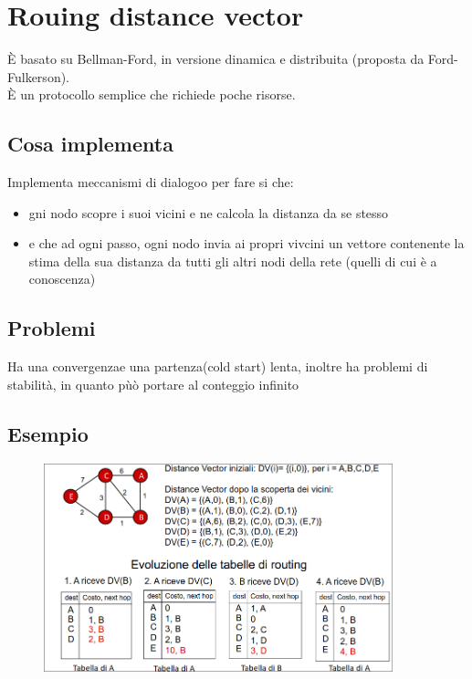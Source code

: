 \documentclass{report}
\begin{document}
        \section{Rouing distance vector}
            È basato su Bellman-Ford, in versione dinamica e distribuita (proposta da Ford-Fulkerson).
            \\
            È un protocollo semplice che richiede poche risorse.
            \subsection{Cosa implementa}
                Implementa meccanismi di dialogoo per fare si che:
                \begin{itemize}
                    \item gni nodo scopre i suoi vicini e ne calcola la distanza da se stesso
                    \item e che ad ogni passo, ogni nodo invia ai propri vivcini un vettore contenente la stima della sua distanza da tutti gli altri nodi della rete (quelli di cui è a conoscenza)
                \end{itemize}
            \subsection{Problemi}
                Ha una convergenzae una partenza(cold start) lenta, inoltre ha problemi di stabilità, in quanto pùò portare al conteggio infinito
            \subsection{Esempio}
                \begin{figure}[H]
                    \includegraphics[width=0.9\textwidth]{3/esDV.png}
                \end{figure}
\end{document}
